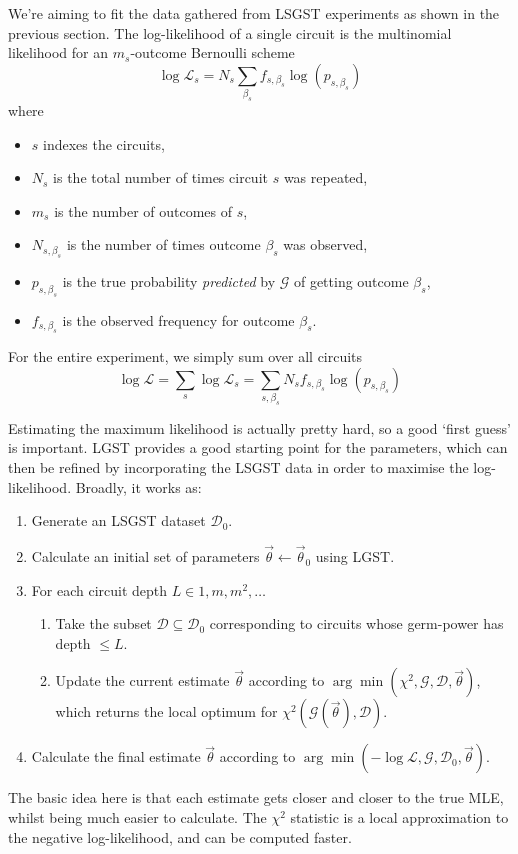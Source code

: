 We're aiming to fit the data gathered from \ac{LSGST} experiments as shown in the previous section.
The log-likelihood of a single circuit is the multinomial likelihood for an $m_s$-outcome Bernoulli
scheme
\begin{equation}
    \log \mathcal{L}_s = N_s \sum_{\beta_s} f_{s, \beta_s} \log(p_{s, \beta_s})
\end{equation}
where 
\begin{itemize}
    \item $s$ indexes the circuits,
    \item $N_s$ is the total number of times circuit $s$ was repeated,
    \item $m_s$ is the number of outcomes of $s$,
    \item $N_{s, \beta_s}$ is the number of times outcome $\beta_s$ was observed,
    \item $p_{s, \beta_s}$ is the true probability \textit{predicted} by $\mathcal{G}$ of getting
    outcome $\beta_s$,
    \item $f_{s, \beta_s}$ is the observed frequency for outcome $\beta_s$.
\end{itemize}
For the entire experiment, we simply sum over all circuits
\begin{equation}
    \log \mathcal{L} = \sum_s \log \mathcal{L}_s = \sum_{s, \beta_s} N_s f_{s, \beta_s} \log(p_{s, \beta_s})
\end{equation}

Estimating the maximum likelihood is actually pretty hard, so a good `first guess' is important.
\ac{LGST} provides a good starting point for the parameters, which can then be refined by
incorporating the \ac{LSGST} data in order to maximise the log-likelihood. Broadly, it works as:
\begin{enumerate}
    \item Generate an \ac{LSGST} dataset $\mathcal{D}_0$.
    \item Calculate an initial set of parameters $\vec{\theta} \leftarrow \vec{\theta}_0$ using \ac{LGST}.
    \item For each circuit depth $L \in 1, m, m^2, \dots$
    \begin{enumerate}
        \item Take the subset $\mathcal{D} \subseteq \mathcal{D}_0$ corresponding to circuits whose
        germ-power has depth $\le L$.
        \item Update the current estimate $\vec{\theta}$ according to $\arg \min (\chi^2,
        \mathcal{G}, \mathcal{D}, \vec{\theta})$, which returns the local optimum for $\chi^2
        (\mathcal{G}(\vec{\theta}), \mathcal{D})$.
    \end{enumerate}
    \item Calculate the final estimate $\vec{\theta}$ according to $\arg \min (- \log \mathcal{L},
    \mathcal{G}, \mathcal{D}_0, \vec{\theta})$.
\end{enumerate}
The basic idea here is that each estimate gets closer and closer to the true MLE, whilst being much
easier to calculate. The $\chi^2$ statistic is a local approximation to the negative log-likelihood,
and can be computed faster.



